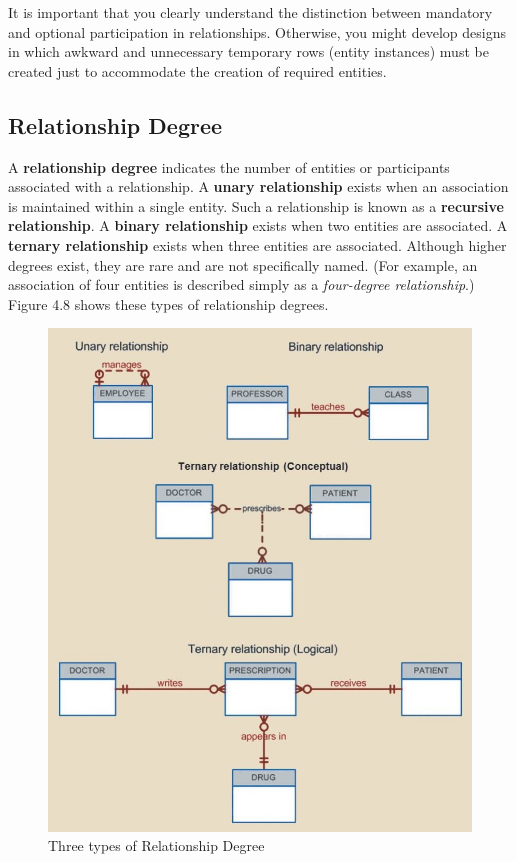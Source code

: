 \documentclass[a4paper, 12pt, titlepage]{report}
\begin{document}
{It is important that you clearly understand the distinction between mandatory and optional participation in relationships. Otherwise, you might develop designs in which
awkward and unnecessary temporary rows (entity instances) must be created just to accommodate the creation of required entities.
\subsection{Relationship Degree}
A \textbf{relationship degree} indicates the number of entities or participants associated with a relationship. A \textbf{unary relationship} exists when an association is maintained within a single entity. Such a relationship is known as a \textbf{recursive relationship}. A \textbf{binary relationship} exists when two entities are associated. A \textbf{ternary relationship} exists when three entities are associated. Although higher degrees exist, they are rare and are not specifically named. (For example, an association of four entities is described simply as a \emph{four-degree relationship}.) Figure 4.8 shows these types of relationship degrees.
\begin{figure}[H]
\centering
\includegraphics[scale=0.6]{Relation}
\caption{Three types of Relationship Degree}
\end{figure}
}
\end{document}
